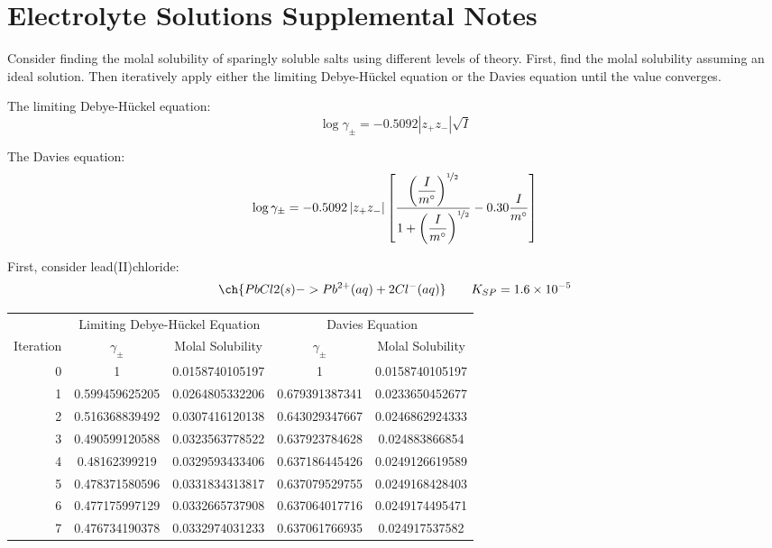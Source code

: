 \documentclass[12pt, openany, letterpaper]{memoir}
\begin{document}
	\section*{Electrolyte Solutions Supplemental Notes}
	Consider finding the molal solubility of sparingly soluble salts using different levels of theory. First, find the molal solubility assuming an ideal solution. Then iteratively apply either the limiting Debye-H\"uckel equation or the Davies equation until the value converges.
	
	The limiting Debye-H\"uckel equation:
	\begin{equation*}
		\log\gamma_\pm = -0.5092\left|z_+z_-\right|\sqrt{I}
	\end{equation*}
	
	The Davies equation:
	\begin{equation*}
		\log\gamma_\pm = -0.5092\left|z_+z_-\right|\left[\dfrac{\left(\dfrac{I}{m^\circ}\right)^{\nicefrac{1}{2}}}{1+\left(\dfrac{I}{m^\circ}\right)^{\nicefrac{1}{2}}}-0.30\dfrac{I}{m^\circ}\right]
	\end{equation*}
	
	First, consider lead(II)chloride:
	\begin{equation*}
		\ch{PbCl2(s) -> Pb^{2+}(aq) + 2 Cl^-(aq)}\hspace{2em} K_{SP} = 1.6\times10^{-5}
	\end{equation*}
	
	\begin{tabular}{r|c|c|c|c}
		 & \multicolumn{2}{c}{Limiting Debye-H\"uckel Equation} & \multicolumn{2}{c}{Davies Equation} \\
		 Iteration & $\gamma_\pm$ & Molal Solubility & $\gamma_\pm$ & Molal Solubility  \\ \midrule
		0 & 1 & 0.0158740105197 & 1 & 0.0158740105197 \\
		1 & 0.599459625205 & 0.0264805332206 & 0.679391387341 & 0.0233650452677 \\
		2 & 0.516368839492 & 0.0307416120138 & 0.643029347667 & 0.0246862924333 \\
		3 & 0.490599120588 & 0.0323563778522 & 0.637923784628 & 0.024883866854 \\
		4 & 0.48162399219 & 0.0329593433406 & 0.637186445426 & 0.0249126619589 \\
		5 & 0.478371580596 & 0.0331834313817 & 0.637079529755 & 0.0249168428403 \\
		6 & 0.477175997129 & 0.0332665737908 & 0.637064017716 & 0.0249174495471 \\
		7 & 0.476734190378 & 0.0332974031233 & 0.637061766935 & 0.024917537582 \\
	\end{tabular}
\end{document}
